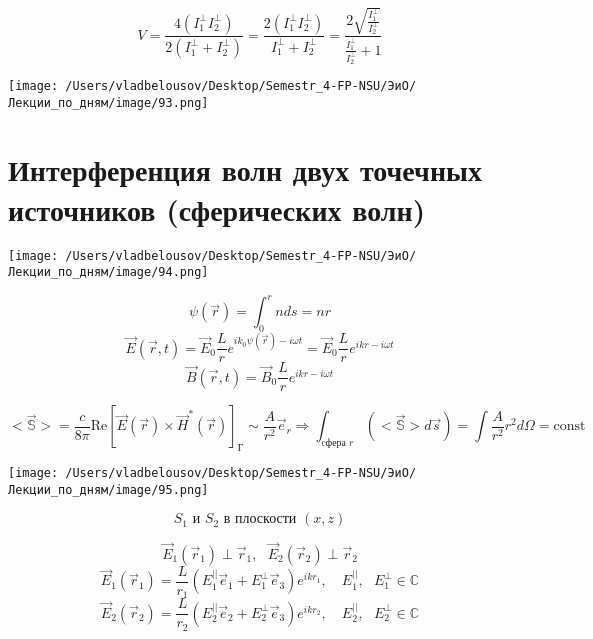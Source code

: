 \documentclass[12pt, a4paper]{report}
\begin{document}
\[ V = \frac{ 4 ( I_1 ^{\perp  }I_2 ^{ \perp }   )}{2 (I_1 ^{\perp  } +I_2 ^{\perp }  )} = \frac{2 ( I_1 ^{\perp } I_2 ^{\perp }  )}{I_1 ^{\perp } + I_2 ^{\perp }  } = \frac{2 \sqrt{\frac{ I_1^{\perp } }{I_2 ^{\perp } } }}{\frac{I_1^{\perp } }{I_2 ^{\perp } } +1}   \] 

\begin{center}
    \texttt{[image: /Users/vladbelousov/Desktop/Semestr\_4-FP-NSU/ЭиО/Лекции\_по\_дням/image/93.png]}
\end{center} 

\section{Интерференция волн двух точечных источников (сферических волн)}

\begin{center}
    \texttt{[image: /Users/vladbelousov/Desktop/Semestr\_4-FP-NSU/ЭиО/Лекции\_по\_дням/image/94.png]}
\end{center} 
\[  \psi (\vec{r } )  = \int_{0}^{ r} n ds  = nr  \] 
\[ \vec{E }  (\vec{r },t  )  = \vec{E } _0 \frac{L}{r } e^{ i k_0 \psi (\vec{r }) - i \omega t } = \vec{E } _ 0 \frac{L}{r}  e^{ i k r - i\omega t }   \] 
\[ \vec{B} (\vec{r },t       ) = \vec{B } _0 \frac{L}{r } e^{ i k r - i \omega t }  \] 

\[ <\vec{\mathbb{S} } >  = \frac{c}{8 \pi } \mathrm{Re }  [ \vec{E }  (\vec{r } ) \times  \vec{H } ^{ * } (\vec{r } )]_{\text{Г} }  \sim \frac{A }{r ^2  } \vec{e } _r \Rightarrow \int_{\text{cфера }r  }  (<\vec{\mathbb{S}} > d \vec{s } ) = \int \frac{ A }{r ^2 } r ^2 d \Omega = \mathrm{const}      \] 

\begin{center}
    \texttt{[image: /Users/vladbelousov/Desktop/Semestr\_4-FP-NSU/ЭиО/Лекции\_по\_дням/image/95.png]}
\end{center} 
\[ S_1 \text{ и } S_2 \text{  в плоскости } (x, z )  \] 

\[ \vec{E } _1 (\vec{r }_1   ) \perp  \vec{r }  _1 , \text{ }  \vec{E } _2 (\vec{r } _2 ) \perp  \vec{r } _2  \] 
\[ \vec{E } _1 (\vec{r } _1 ) = \frac{L}{r_1} (E_1 ^{ || }  \vec{e }  _1 + E_1 ^{\perp  } \vec{e } _3  ) e^{ i k r_1 } , \quad  E_1 ^{ || }  ,\text{ }    E_1 ^{ \perp  } \in  \mathbb{C}   \]  
\[ \vec{E } _2 (\vec{r } _2 ) = \frac{L}{r_2} (E_2 ^{ || }  \vec{e }  _2 + E_2 ^{\perp  } \vec{e } _3  ) e^{ i k r_2 } , \quad  E_2 ^{ || }  ,\text{ }    E_2 ^{ \perp  } \in  \mathbb{C}   \]  
\end{document}
